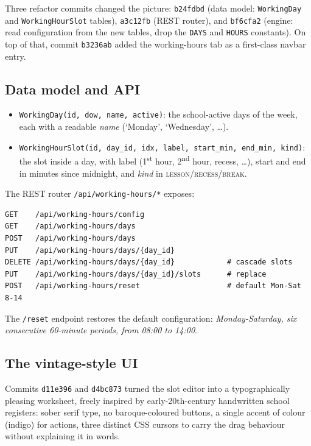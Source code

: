 Three refactor commits changed the picture: \texttt{b24fdbd}
(data model: \texttt{WorkingDay} and \texttt{WorkingHourSlot}
tables), \texttt{a3c12fb} (REST router), and \texttt{bf6cfa2}
(engine: read configuration from the new tables, drop the
\texttt{DAYS} and \texttt{HOURS} constants). On top of that,
commit \texttt{b3236ab} added the working-hours tab as a
first-class navbar entry.

\subsection{Data model and API}

\begin{itemize}
  \item \texttt{WorkingDay(id, dow, name, active)}: the
    school-active days of the week, each with a readable
    \emph{name} (`Monday', `Wednesday', \dots).
  \item \texttt{WorkingHourSlot(id, day\_id, idx, label,
    start\_min, end\_min, kind)}: the slot inside a day, with
    label (1\textsuperscript{st} hour, 2\textsuperscript{nd}
    hour, recess, \dots), start and end in minutes since
    midnight, and \emph{kind} in
    \textsc{lesson}/\textsc{recess}/\textsc{break}.
\end{itemize}

The REST router \texttt{/api/working-hours/*} exposes:
\begin{lstlisting}[basicstyle=\ttfamily\footnotesize]
GET    /api/working-hours/config
GET    /api/working-hours/days
POST   /api/working-hours/days
PUT    /api/working-hours/days/{day_id}
DELETE /api/working-hours/days/{day_id}            # cascade slots
PUT    /api/working-hours/days/{day_id}/slots      # replace
POST   /api/working-hours/reset                    # default Mon-Sat 8-14
\end{lstlisting}

The \texttt{/reset} endpoint restores the default configuration:
\emph{Monday-Saturday, six consecutive 60-minute periods, from
08:00 to 14:00}.

\subsection{The vintage-style UI}

Commits \texttt{d11e396} and \texttt{d4bc873} turned the slot
editor into a typographically pleasing worksheet, freely inspired
by early-20th-century handwritten school registers: sober serif
type, no baroque-coloured buttons, a single accent of colour
(indigo) for actions, three distinct CSS cursors to carry the
drag behaviour without explaining it in words.

